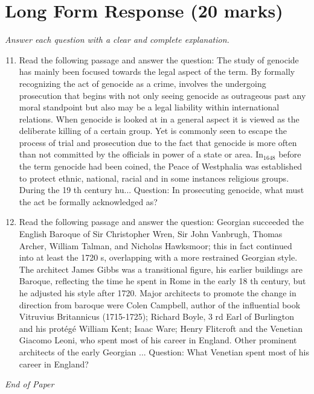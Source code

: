 \documentclass[12pt]{article}
\begin{document}
\section*{Long Form Response (20 marks)}
\textit{Answer each question with a clear and complete explanation.}
\begin{enumerate}[label=\arabic*.]
\setcounter{enumi}{10}
\item Read the following passage and answer the question: The study of genocide has mainly been focused towards the legal aspect of the term. By formally recognizing the act of genocide as a crime, involves the undergoing prosecution that begins with not only seeing genocide as outrageous past any moral standpoint but also may be a legal liability within international relations. When genocide is looked at in a general aspect it is viewed as the deliberate killing of a certain group. Yet is commonly seen to escape the process of trial and prosecution due to the fact that genocide is more often than not committed by the officials in power of a state or area. In$_{1648}$ before the term genocide had been coined, the Peace of Westphalia was established to protect ethnic, national, racial and in some instances religious groups. During the 19 th century hu... Question: In prosecuting genocide, what must the act be formally acknowledged as?
\item Read the following passage and answer the question: Georgian succeeded the English Baroque of Sir Christopher Wren, Sir John Vanbrugh, Thomas Archer, William Talman, and Nicholas Hawksmoor; this in fact continued into at least the 1720 s, overlapping with a more restrained Georgian style. The architect James Gibbs was a transitional figure, his earlier buildings are Baroque, reflecting the time he spent in Rome in the early 18 th century, but he adjusted his style after 1720. Major architects to promote the change in direction from baroque were Colen Campbell, author of the influential book Vitruvius Britannicus (1715-1725); Richard Boyle, 3 rd Earl of Burlington and his protégé William Kent; Isaac Ware; Henry Flitcroft and the Venetian Giacomo Leoni, who spent most of his career in England. Other prominent architects of the early Georgian ... Question: What Venetian spent most of his career in England?
\end{enumerate}

\vfill
\noindent\textit{End of Paper}
\end{document}

